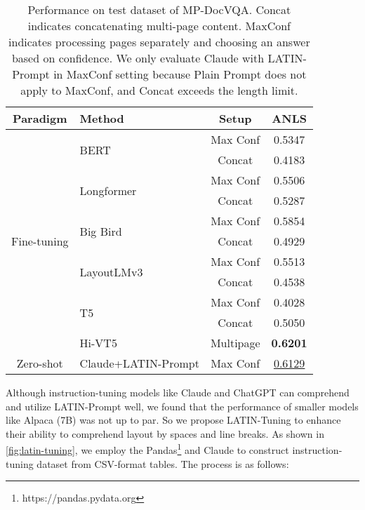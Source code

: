\documentclass[letterpaper]{article} \usepackage{aaai24_preprint}  \usepackage{times}  \usepackage{helvet}  \usepackage{courier}  \usepackage[hyphens]{url}  \usepackage{graphicx} \urlstyle{rm} \def\UrlFont{\rm}  \usepackage{natbib}  \usepackage{caption} \frenchspacing  \setlength{\pdfpagewidth}{8.5in} \setlength{\pdfpageheight}{11in} \usepackage{algorithm}
\begin{document}
\begin{table}[t]
\small
\centering
\begin{tabular}{@{}clcc@{}}
\toprule
Paradigm                      & Method                      & Setup     & ANLS            \\ \midrule
\multirow{11}{*}{Fine-tuning} & \multirow{2}{*}{BERT}       & Max Conf  & 0.5347          \\
                              &                             & Concat    & 0.4183          \\ \cmidrule(l){2-4} 
                              & \multirow{2}{*}{Longformer} & Max Conf  & 0.5506          \\
                              &                             & Concat    & 0.5287          \\ \cmidrule(l){2-4} 
                              & \multirow{2}{*}{Big Bird}   & Max Conf  & 0.5854          \\
                              &                             & Concat    & 0.4929          \\ \cmidrule(l){2-4} 
                              & \multirow{2}{*}{LayoutLMv3} & Max Conf  & 0.5513          \\
                              &                             & Concat    & 0.4538          \\ \cmidrule(l){2-4} 
                              & \multirow{2}{*}{T5}         & Max Conf  & 0.4028          \\
                              &                             & Concat    & 0.5050          \\ \cmidrule(l){2-4} 
                              & Hi-VT5                      & Multipage & \textbf{0.6201} \\ \midrule
Zero-shot                     & Claude+LATIN-Prompt      & Max Conf  & \underline{0.6129}    \\ \bottomrule
\end{tabular}
\caption{
Performance on test dataset of MP-DocVQA.
Concat indicates concatenating multi-page content.
MaxConf indicates processing pages separately and choosing an answer based on confidence.
We only evaluate Claude with LATIN-Prompt in MaxConf setting because Plain Prompt does not apply to MaxConf, and Concat exceeds the length limit.
}
\label{tab:exp_mpdocvqa}
\end{table}
Although instruction-tuning models like Claude and ChatGPT can comprehend and utilize LATIN-Prompt well, we found that the performance of smaller models like Alpaca (7B) was not up to par.
So we propose LATIN-Tuning to enhance their ability to comprehend layout by spaces and line breaks.
As shown in \cref{fig:latin-tuning}, we employ the Pandas\footnote{https://pandas.pydata.org} and Claude to construct instruction-tuning dataset from CSV-format tables.
The process is as follows:
\end{document}
